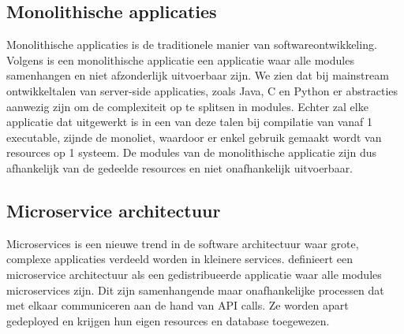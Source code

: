\subsection{Monolithische applicaties}
Monolithische applicaties is de traditionele manier van softwareontwikkeling. Volgens \textcite{Dragoni2016} is een monolithische applicatie een applicatie waar alle modules samenhangen en niet afzonderlijk uitvoerbaar zijn. We zien dat bij mainstream ontwikkeltalen van server-side applicaties, zoals Java, C en Python er abstracties aanwezig zijn om de complexiteit op te splitsen in modules. Echter zal elke applicatie dat uitgewerkt is in een van deze talen bij compilatie van vanaf 1 executable, zijnde de monoliet, waardoor er enkel gebruik gemaakt wordt van resources op 1 systeem. De modules van de monolithische applicatie zijn dus afhankelijk van de gedeelde resources en niet onafhankelijk uitvoerbaar.

\subsection{Microservice architectuur}
Microservices is een nieuwe trend in de software architectuur waar grote, complexe applicaties verdeeld worden in kleinere services. \textcite{Dragoni2016} definieert een microservice architectuur als een gedistribueerde applicatie waar alle modules microservices zijn. Dit zijn samenhangende maar onafhankelijke processen dat met elkaar communiceren aan de hand van API calls. Ze worden apart gedeployed en krijgen hun eigen resources en database toegewezen. 


